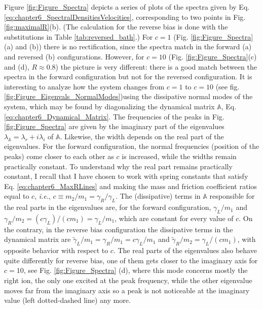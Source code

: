 %
Figure \ref{fig:Figure_Spectra} depicts a series of plots of the spectra given by Eq. \eqref{eq:chapter6_SpectralDensitiesVelocities}, corresponding to two points in Fig. \ref{fig:maximalR}(b). (The calculation for the reverse bias is done with the substitutions in Table \ref{tab:reversed_bath}.)
For $c=1$ (Fig. \ref{fig:Figure_Spectra}(a) and (b)) there is no rectification, since the spectra match in the forward (a) and reversed (b) configurations. However, for $c=10$ (Fig. \ref{fig:Figure_Spectra}(c) and (d), $R\approx 0.8$) the picture is very different: there is a good match between the spectra in the forward configuration but not for the reversed configuration. It is interesting to analyze how the system changes from $c=1$ to $c=10$ (see fig. \ref{fig:Figure_Eigenvals_NormalModes})using the dissipative normal modes of the system, which may be found by diagonalizing the dynamical matrix $\mathbb{A}$, Eq. \eqref{eq:chapter6_Dynamical_Matrix}. The frequencies of the peaks in Fig. \ref{fig:Figure_Spectra} are given by the imaginary part of the eigenvalues $\lambda_\mathbb{A} = \lambda_r + i \lambda_i$ of $\mathbb{A}$. Likewise, the width depends on  the real part of the eigenvalues. For the forward configuration, the normal frequencies (position of the peaks) come closer to each other as $c$ is increased, while the widths remain practically constant. To understand why the real part remains practically constant, I recall that I have chosen to work with spring constants that satisfy Eq. \eqref{eq:chapter6_MaxRLines} and making the mass and friction coefficient ratios equal to $c$, \textit{i.e.}, $ c\equiv m_2/m_1 = \gamma_R/\gamma_L$. The (dissipative) terms in $\mathbb{A}$ responsible for the real parts in the eigenvalues are,
for the forward configuration,  $\gamma_L/m_1$ and $\gamma_R/m_2 = (c \gamma_L)/(c m_1) = \gamma_L/m_1$, which are constant for every value of $c$. On the contrary, in the reverse bias configuration  the dissipative terms in the dynamical matrix  are $\tilde{\gamma}_L/m_1 = \gamma_R/m_1 = c\gamma_L/m_1$ and $\tilde{\gamma}_R/m_2 = \gamma_L/ (c m_1)$, with opposite behavior with respect to $c$. The real parts of the eigenvalues
also behave quite differently for reverse bias, one of them gets closer to the imaginary axis for $c=10$,
see Fig. \ref{fig:Figure_Spectra} (d), where this mode  concerns mostly the right ion,
the only one excited at the peak frequency, while the other eigenvalue  moves far from the imaginary axis so a peak is not noticeable
at the imaginary value (left dotted-dashed line) any more.

